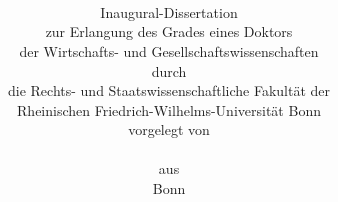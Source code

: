 





\frontmatter  %


\noindent%
\begin{center}
	\begin{minipage}[t][0.99\textheight][t]{0.9\textwidth}
		\title{\sffamily\bfseries\LARGE%
			~\\[-10ex]
			\disstitle%
		}
		\author{\large{}%
		\\[5ex]%
		{\Large Inaugural-Dissertation}%
		\\[2ex]%
		zur Erlangung des Grades eines Doktors \\%
		der Wirtschafts- und Gesellschaftswissenschaften \\[1.25ex]%
		durch \\[1.25ex]%
		die Rechts- und Staatswissenschaftliche Fakultät der \\%
		Rheinischen Friedrich-Wilhelms-Universität Bonn \\[2ex]%
		vorgelegt von \\[3ex]%
		\textbf{%
			{\Large \dissauthor}
		}
		\\[2ex]%
		aus \dissbornin
		\\[8em]%
		Bonn
		}
		\date{{\Large\dissyear}%
		}

		\maketitle
	\end{minipage}
\end{center}

\thispagestyle{bullshitheader}







